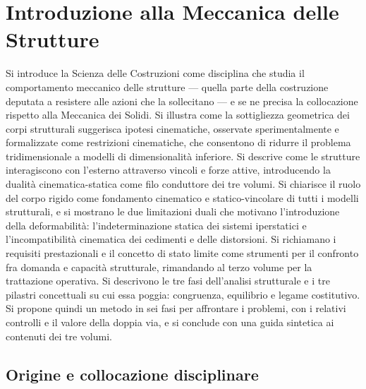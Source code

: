 \graphicspath{{Parti/P00-Introduzione/C00-Introduzione/Figure/}}
\chapter{Introduzione alla Meccanica delle Strutture}\label{cap:introduzione}

\begin{sommario}
	Si introduce la Scienza delle Costruzioni come disciplina che studia il comportamento meccanico delle strutture --- quella parte della costruzione deputata a resistere alle azioni che la sollecitano --- e se ne precisa la collocazione rispetto alla Meccanica dei Solidi. Si illustra come la sottigliezza geometrica dei corpi strutturali suggerisca ipotesi cinematiche, osservate sperimentalmente e formalizzate come restrizioni cinematiche, che consentono di ridurre il problema tridimensionale a modelli di dimensionalità inferiore. Si descrive come le strutture interagiscono con l'esterno attraverso vincoli e forze attive, introducendo la dualità cinematica-statica come filo conduttore dei tre volumi. Si chiarisce il ruolo del corpo rigido come fondamento cinematico e statico-vincolare di tutti i modelli strutturali, e si mostrano le due limitazioni duali che motivano l'introduzione della deformabilità: l'indeterminazione statica dei sistemi iperstatici e l'incompatibilità cinematica dei cedimenti e delle distorsioni. Si richiamano i requisiti prestazionali e il concetto di stato limite come strumenti per il confronto fra domanda e capacità strutturale, rimandando al terzo volume per la trattazione operativa. Si descrivono le tre fasi dell'analisi strutturale e i tre pilastri concettuali su cui essa poggia: congruenza, equilibrio e legame costitutivo. Si propone quindi un metodo in sei fasi per affrontare i problemi, con i relativi controlli e il valore della doppia via, e si conclude con una guida sintetica ai contenuti dei tre volumi.
\end{sommario}

\section{Origine e collocazione disciplinare}

